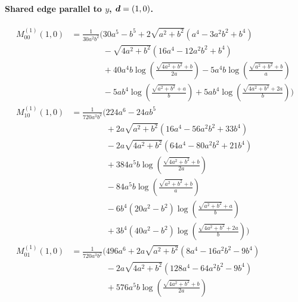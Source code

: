 \paragraph{Shared edge parallel to $y$, $\vb*{d}=(1,0)$.}
\begin{align*}
M^{(1)}_{00}(1,0) &= \frac{1}{30 a^{2} b^{2}}\Bigg(30 a^{5} - b^{5} + 2 \sqrt{a^{2} + b^{2}}\left(a^{4} - 3 a^{2} b^{2} + b^{4}\right)\\
&\phantom{{}=\frac{1}{30 a^{2} b^{2}}\Bigg(}- \sqrt{4 a^{2} + b^{2}}\left(16 a^{4} - 12 a^{2} b^{2} + b^{4}\right)\\
&\phantom{{}=\frac{1}{30 a^{2} b^{2}}\Bigg(}+ 40 a^{4} b \log\left(\frac{\sqrt{4 a^{2} + b^{2}} + b}{2 a}\right) - 5 a^{4} b \log\left(\frac{\sqrt{a^{2} + b^{2}} + b}{a}\right)\\
&\phantom{{}=\frac{1}{30 a^{2} b^{2}}\Bigg(}- 5 a b^{4} \log\left(\frac{\sqrt{a^{2} + b^{2}} + a}{b}\right) + 5 a b^{4} \log\left(\frac{\sqrt{4 a^{2} + b^{2}} + 2 a}{b}\right)\Bigg)\\[1.2ex]
M^{(1)}_{10}(1,0) &= \frac{1}{720 a^{3} b^{2}}\Bigg(224 a^{6} - 24 a b^{5}\\
&\phantom{{}=\frac{1}{720 a^{3} b^{2}}\Bigg(}+ 2 a \sqrt{a^{2} + b^{2}}\left(16 a^{4} - 56 a^{2} b^{2} + 33 b^{4}\right)\\
&\phantom{{}=\frac{1}{720 a^{3} b^{2}}\Bigg(}- 2 a \sqrt{4 a^{2} + b^{2}}\left(64 a^{4} - 80 a^{2} b^{2} + 21 b^{4}\right)\\
&\phantom{{}=\frac{1}{720 a^{3} b^{2}}\Bigg(}+ 384 a^{5} b \log\left(\frac{\sqrt{4 a^{2} + b^{2}} + b}{2 a}\right)\\
&\phantom{{}=\frac{1}{720 a^{3} b^{2}}\Bigg(}- 84 a^{5} b \log\left(\frac{\sqrt{a^{2} + b^{2}} + b}{a}\right)\\
&\phantom{{}=\frac{1}{720 a^{3} b^{2}}\Bigg(}- 6 b^{4} \left(20 a^{2} - b^{2}\right) \log\left(\frac{\sqrt{a^{2} + b^{2}} + a}{b}\right)\\
&\phantom{{}=\frac{1}{720 a^{3} b^{2}}\Bigg(}+ 3 b^{4} \left(40 a^{2} - b^{2}\right) \log\left(\frac{\sqrt{4 a^{2} + b^{2}} + 2 a}{b}\right)\Bigg)\\[1.2ex]
M^{(1)}_{01}(1,0) &= \frac{1}{720 a^{3} b^{2}}\Bigg(496 a^{6} + 2 a \sqrt{a^{2} + b^{2}}\left(8 a^{4} - 16 a^{2} b^{2} - 9 b^{4}\right)\\
&\phantom{{}=\frac{1}{720 a^{3} b^{2}}\Bigg(}- 2 a \sqrt{4 a^{2} + b^{2}}\left(128 a^{4} - 64 a^{2} b^{2} - 9 b^{4}\right)\\
&\phantom{{}=\frac{1}{720 a^{3} b^{2}}\Bigg(}+ 576 a^{5} b \log\left(\frac{\sqrt{4 a^{2} + b^{2}} + b}{2 a}\right)\\

\end{align*}
